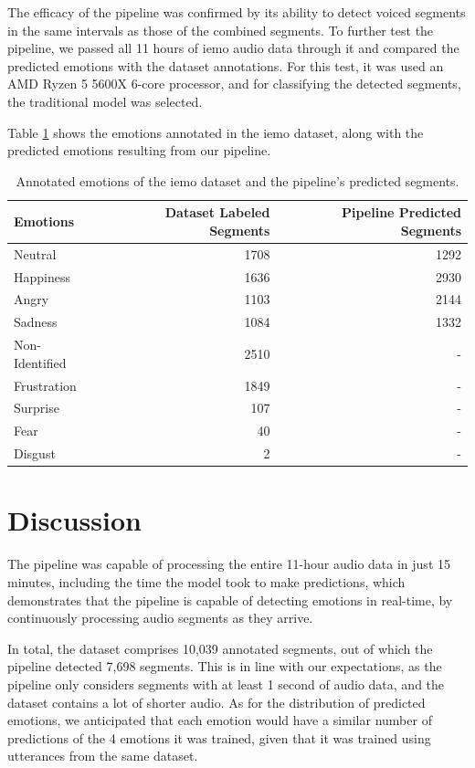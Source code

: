 The efficacy of the pipeline was confirmed by its ability to detect voiced segments in the same intervals as those of the combined segments. To further test the pipeline, we passed all 11 hours of \ac{iemo} audio data through it and compared the predicted emotions with the dataset annotations. For this test, it was used an AMD Ryzen 5 5600X 6-core processor, and for classifying the detected segments, the traditional model was selected.

Table \ref{tab:iemopipeline} shows the emotions annotated in the \ac{iemo} dataset, along with the predicted emotions resulting from our pipeline.

\begin{table}[H]
	\centering
	\caption{Annotated emotions of the \ac{iemo} dataset and the pipeline's predicted segments.}
	\label{tab:iemopipeline}
	\begin{tabular}{lrr}
		\toprule
		Emotions & Dataset Labeled Segments & Pipeline Predicted Segments \\
		\midrule
		Neutral & 1708 & 1292 \\
		Happiness & 1636 & 2930 \\
		Angry & 1103 & 2144 \\
		Sadness & 1084 & 1332 \\
		Non-Identified & 2510 & - \\
		Frustration & 1849 & - \\
		Surprise	& 107 & - \\
		Fear & 40 & - \\
		Disgust & 2 & - \\
		\bottomrule
	\end{tabular}
\end{table}

\section{Discussion}

The pipeline was capable of processing the entire 11-hour audio data in just 15 minutes, including the time the model took to make predictions, which demonstrates that the pipeline is capable of detecting emotions in real-time, by continuously processing audio segments as they arrive.

In total, the dataset comprises 10,039 annotated segments, out of which the pipeline detected 7,698 segments. This is in line with our expectations, as the pipeline only considers segments with at least 1 second of audio data, and the dataset contains a lot of shorter audio. As for the distribution of predicted emotions, we anticipated that each emotion would have a similar number of predictions of the 4 emotions it was trained, given that it was trained using utterances from the same dataset.

